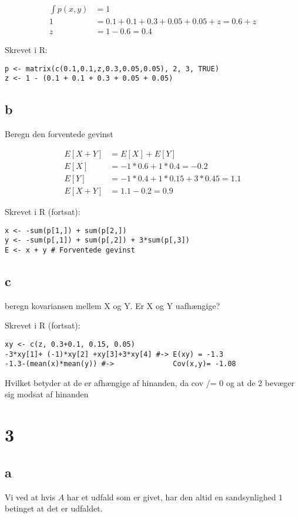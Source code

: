 \documentclass[11pt]{article}
\begin{document}
\begin{align}
\int p(x,y) &= 1 \\
1 &= 0.1 + 0.1 + 0.3 + 0.05 + 0.05 + z = 0.6 + z \\
z &= 1 - 0.6 = 0.4
\end{align}

Skrevet i R:
\begin{verbatim}
p <- matrix(c(0.1,0.1,z,0.3,0.05,0.05), 2, 3, TRUE)
z <- 1 - (0.1 + 0.1 + 0.3 + 0.05 + 0.05)
\end{verbatim}
\subsection{b}
\label{sec:org7f51812}
Beregn den forventede gevinst

\begin{align}
E[X+Y] &= E[X] + E[Y] \\
E[X] &= -1*0.6 + 1*0.4 = -0.2 \\
E[Y] &= -1*0.4 + 1*0.15 + 3*0.45 = 1.1 \\
E[X+Y] &= 1.1 - 0.2 = 0.9
\end{align}

Skrevet i R (fortsat):

\begin{verbatim}
x <- -sum(p[1,]) + sum(p[2,])
y <- -sum(p[,1]) + sum(p[,2]) + 3*sum(p[,3])
E <- x + y # Forventede gevinst
\end{verbatim}
\subsection{c}
\label{sec:org2e1cd51}
beregn kovariansen mellem X og Y. Er X og Y uafhængige?

Skrevet i R (fortsat):
\begin{verbatim}
xy <- c(z, 0.3+0.1, 0.15, 0.05)
-3*xy[1]+ (-1)*xy[2] +xy[3]+3*xy[4] #-> E(xy) = -1.3
-1.3-(mean(x)*mean(y)) #->              Cov(x,y)= -1.08
\end{verbatim}

Hvilket betyder at de er afhængige af hinanden, da cov /= 0 og at de 2 bevæger sig modsat af hinanden

\section{3}
\label{sec:orgcade4cc}
\subsection{a}
\label{sec:orgddb580a}
Vi ved at hvis \(A\) har et udfald som er givet,
har den altid en sandsynlighed \(1\) betinget at det er udfaldet.
\end{document}
